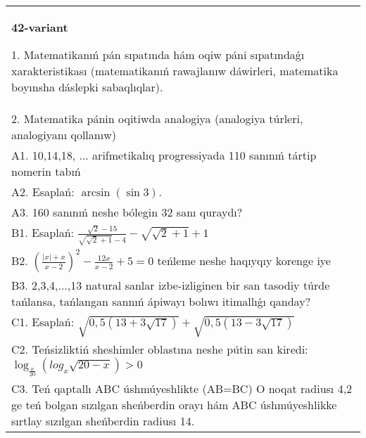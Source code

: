 \documentclass{article}
\begin{document}
\begin{tabular}{m{17cm}}
\textbf{42-variant}

1. Matematikanıń pán sıpatında hám oqiw páni sıpatındaǵı xarakteristikası (matematikanıń rawajlanıw dáwirleri, matematika boyınsha dáslepki sabaqlıqlar). \\
2. Matematika pánin oqitiwda analogiya (analogiya túrleri, analogiyanı qollanıw) \\
A1. 10,14,18, ... arifmetikalıq progressiyada 110 sanınıń tártip nomerin tabıń \\
A2. Esaplań: \(\arcsin (\sin3 ) \). \\
A3. 160 sanınıń neshe bólegin 32 sanı quraydı? \\
B1. Esaplań: \(\frac{\sqrt{2} - 15}{\sqrt{\sqrt{2} + 1} - 4} - \sqrt{\sqrt{2} + 1} + 1\) \\
B2. $(\frac{|x| + x}{x-2})^{2} - \frac{12x}{x-2} + 5 = 0$ teńleme neshe haqıyqıy korenge iye \\
B3. 2,3,4,...,13 natural sanlar izbe-izliginen bir san tasodiy túrde tańlansa, tańlangan sannıń ápiwayı bolıwı itimallıǵı qanday? \\
C1. Esaplań: \(\sqrt{0,5 (13 + 3\sqrt{17}) } + \sqrt{0,5 (13 - 3\sqrt{17}) }\) \\
C2. Teńsizliktiń sheshimler oblastına neshe pútin san kiredi:\(\log_{\frac{x}{20}} (log_{x}\sqrt{20 - x}) > 0\) \\
C3. Teń qaptallı ABC úshmúyeshlikte (AB=BC) O noqat radiusı 4,2 ge teń bolgan sızılgan sheńberdin orayı hám ABC úshmúyeshlikke sırtlay sızılgan sheńberdin radiusı 14. \\

\end{tabular}
\vspace{1cm}
\end{document}
